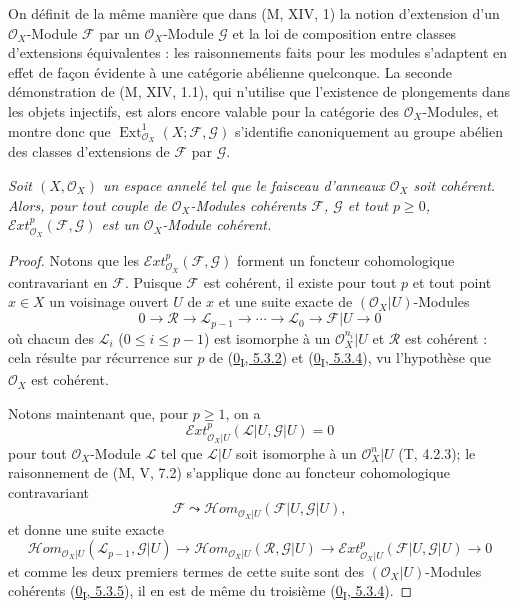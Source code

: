 \begin{env}[12.3.2]
\label{0.12.3.2-fr}
On définit de la même manière que dans (M, XIV, 1) la notion d'extension d'un
$\mathcal O_X$-Module $\mathcal F$ par un $\mathcal O_X$-Module $\mathcal G$
et la loi de composition entre classes d'extensions équivalentes : les
raisonnements faits pour les modules s'adaptent en effet de façon évidente à
une catégorie abélienne quelconque. La seconde démonstration de (M, XIV, 1.1),
qui n'utilise que l'existence de plongements dans les objets injectifs, est
alors encore valable pour la catégorie des $\mathcal O_X$-Modules, et montre
donc que $\operatorname{Ext}_{\mathcal O_X}^1(X;\mathcal F,\mathcal G)$
s'identifie canoniquement au groupe abélien des classes d'extensions de
$\mathcal F$ par $\mathcal G$.
\end{env}

\begin{proposition}[12.3.3]
\label{0.12.3.3-fr}
\emph{Soit $(X,\mathcal O_X)$ un espace annelé tel que le faisceau d'anneaux
$\mathcal O_X$ soit cohérent. Alors, pour tout couple de
$\mathcal O_X$-Modules cohérents $\mathcal F$, $\mathcal G$ et tout
$p\geq0$, $\mathcal{E}xt_{\mathcal O_X}^p(\mathcal F,\mathcal G)$ est un
$\mathcal O_X$-Module cohérent.}
\end{proposition}

\begin{proof}
Notons que les $\mathcal{E}xt_{\mathcal O_X}^p(\mathcal F,\mathcal G)$
forment un foncteur cohomologique contravariant en $\mathcal F$. Puisque
$\mathcal F$ est cohérent, il existe pour tout $p$ et tout point $x\in X$ un
voisinage ouvert $U$ de $x$ et une suite exacte de
$(\mathcal O_X|U)$-Modules
\[
0\longrightarrow\mathcal R\longrightarrow\mathcal L_{p-1}
\longrightarrow\cdots\longrightarrow\mathcal L_0
\longrightarrow\mathcal F|U\longrightarrow0
\]
où chacun des $\mathcal L_i$ ($0\leq i\leq p-1$) est isomorphe à un
$\mathcal O_X^{n_i}|U$ et $\mathcal R$ est cohérent : cela résulte par
récurrence sur $p$ de (\hyperref[0.5.3.2-fr]{0\textsubscript{I}, 5.3.2}) et
(\hyperref[0.5.3.4-fr]{0\textsubscript{I}, 5.3.4}), vu l'hypothèse que
$\mathcal O_X$ est cohérent.

Notons maintenant que, pour $p\geq1$, on a
\[
\mathcal{E}xt_{\mathcal O_X|U}^p(\mathcal L|U,\mathcal G|U)=0
\]
pour tout $\mathcal O_X$-Module $\mathcal L$ tel que $\mathcal L|U$ soit
isomorphe à un $\mathcal O_X^n|U$ (T, 4.2.3); le raisonnement de (M, V, 7.2)
s'applique donc au foncteur cohomologique contravariant
\[
\mathcal F\leadsto
\mathcal{H}om_{\mathcal O_X|U}(\mathcal F|U,\mathcal G|U),
\]
et donne une suite exacte
\[
\mathcal{H}om_{\mathcal O_X|U}(\mathcal L_{p-1},\mathcal G|U)
\longrightarrow
\mathcal{H}om_{\mathcal O_X|U}(\mathcal R,\mathcal G|U)
\longrightarrow
\mathcal{E}xt_{\mathcal O_X|U}^p(\mathcal F|U,\mathcal G|U)
\longrightarrow0
\]
et comme les deux premiers termes de cette suite sont des
$(\mathcal O_X|U)$-Modules cohérents
(\hyperref[0.5.3.5-fr]{0\textsubscript{I}, 5.3.5}), il en est de même du
troisième (\hyperref[0.5.3.4-fr]{0\textsubscript{I}, 5.3.4}).
\end{proof}

